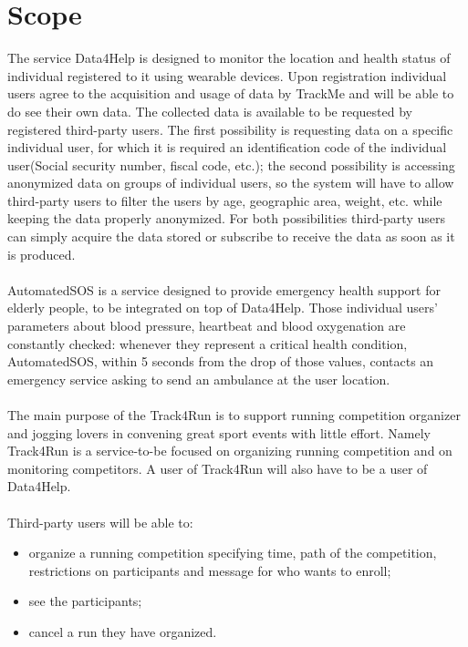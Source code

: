 \section{Scope}
The service Data4Help is designed to monitor the location and health status of individual registered to it using wearable devices. Upon registration individual users agree to the acquisition and usage of data by TrackMe and will be able to do see their own data.
The collected data is available to be requested by registered third-party users. The first possibility is requesting data on a specific individual user, for which it is required an identification code of the individual user(Social security number, fiscal code, etc.); the second possibility is accessing anonymized data on groups of individual users, so the system will have to allow third-party users to filter the users by age, geographic area, weight, etc. while keeping the data properly anonymized.
For both possibilities third-party users can simply acquire the data stored or subscribe to receive the data as soon as it is produced.
\\
\\
AutomatedSOS is a service designed to provide emergency health support for elderly people, to be integrated on top of Data4Help. Those individual users’ parameters about blood pressure, heartbeat and blood oxygenation are constantly checked: whenever they represent a critical health condition, AutomatedSOS, within 5 seconds from the drop of those values, contacts an emergency service asking to send an ambulance at the user location.
\\
\\
The main purpose of the Track4Run is to support running competition organizer and jogging lovers in convening great sport events with little effort. Namely Track4Run is a service-to-be focused on organizing running competition and on monitoring competitors. A user of Track4Run will also have to be a user of Data4Help. 
\\ 
\\
Third-party users will be able to: 
\begin{itemize}
\item 
organize a running competition specifying time, path of the competition, restrictions on participants and message for who wants to enroll;
\item 
see the participants; 
\item 
cancel a run they have organized. 
\end{itemize}

